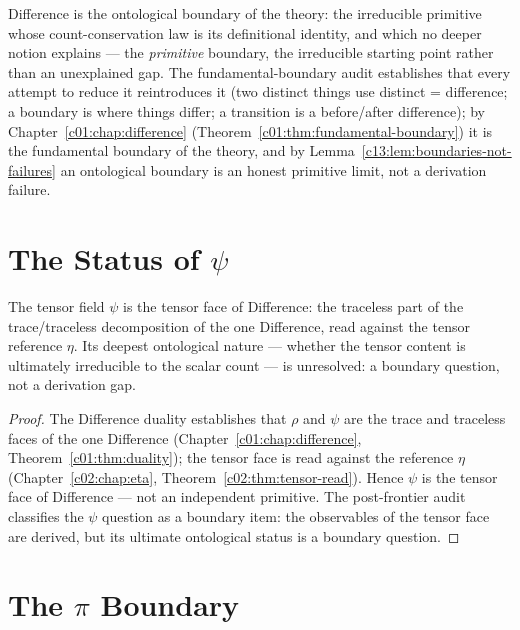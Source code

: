 Difference is the ontological boundary of the theory: the irreducible primitive whose
count-conservation law is its definitional identity, and which no deeper notion explains
--- the \emph{primitive} boundary, the irreducible starting point rather than an unexplained
gap. The fundamental-boundary audit \cite{c13:QG278} establishes that every attempt to reduce
it reintroduces it (two distinct things use distinct = difference; a boundary is where
things differ; a transition is a before/after difference); by
Chapter~\ref{c01:chap:difference} (Theorem~\ref{c01:thm:fundamental-boundary}) it is the
fundamental boundary of the theory, and by Lemma~\ref{c13:lem:boundaries-not-failures} an
ontological boundary is an honest primitive limit, not a derivation failure.
\label{c13:thm:difference-ontological}

\section{The Status of \texorpdfstring{$\psi$}{psi}}
\label{c13:sec:psi-status}

\begin{theorem}
\label{c13:thm:psi-face}
The tensor field $\psi$ is the tensor face of Difference: the traceless part of the
trace/traceless decomposition of the one Difference, read against the tensor reference
$\eta$. Its deepest ontological nature --- whether the tensor content is ultimately
irreducible to the scalar count --- is unresolved: a boundary question, not a derivation gap.
\end{theorem}

\begin{proof}
The Difference duality \cite{c13:QG286} establishes that $\rho$ and $\psi$ are the trace and
traceless faces of the one Difference (Chapter~\ref{c01:chap:difference},
Theorem~\ref{c01:thm:duality}); the tensor face is read against the reference $\eta$
(Chapter~\ref{c02:chap:eta}, Theorem~\ref{c02:thm:tensor-read}). Hence $\psi$ is the tensor
face of Difference --- not an independent primitive. The post-frontier audit
\cite{c13:QG299} classifies the $\psi$ question as a boundary item: the observables of the
tensor face are derived, but its ultimate ontological status is a boundary question.
\end{proof}

\section{The \texorpdfstring{$\pi$}{pi} Boundary}
\label{c13:sec:pi-boundary}

